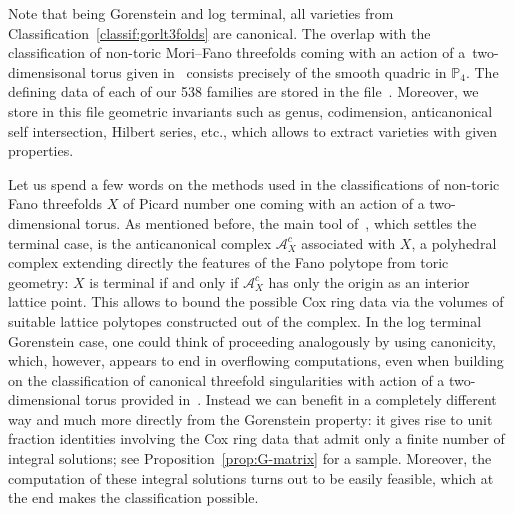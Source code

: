 \documentclass[10pt,a4paper]{amsart}
\theoremstyle{definition}
\def\PP{{\mathbb P}}
\numberwithin{equation}{section}
\begin{document}
Note that being Gorenstein and log terminal,
all varieties from
Classification~\ref{classif:gorlt3folds}
are canonical.
The overlap with the classification of
non-toric Mori--Fano threefolds coming with
an action of a~two-dimensisonal torus given
in~\cite{BeHaHuNi} consists
precisely of the smooth quadric in $\PP_4$.
The defining data of each of our 538
families are stored in the file~\cite{BaHa}.
Moreover, we store in this file geometric
invariants such as genus, codimension,
anticanonical self intersection, Hilbert series,
etc., which allows to extract varieties with
given properties.

Let us spend a few words on the methods used
in the classifications of non-toric Fano threefolds
$X$ of Picard number one coming with an action of
a two-dimensional torus.
As mentioned before, the main tool of~\cite{BeHaHuNi},
which settles the terminal case, is the
anticanonical complex $\mathcal{A}_X^c$
associated with $X$, a polyhedral complex
extending directly the features of the Fano
polytope from toric geometry: $X$ is
terminal if and only if $\mathcal{A}_X^c$
has only the origin as an interior lattice
point. This allows to bound the possible
Cox ring data via the volumes of
suitable lattice polytopes constructed
out of the complex.
In the log terminal Gorenstein case, one
could think of proceeding analogously by
using canonicity, which, however, appears
to end in overflowing computations, even
when building on the classification of
canonical threefold singularities with
action of a two-dimensional torus provided
in~\cite{BrHae}.
Instead we can benefit in a completely
different way and much more directly from
the Gorenstein property: it gives rise to
unit fraction identities involving
the Cox ring data that admit only
a finite number of integral solutions; see
Proposition~\ref{prop:G-matrix} for a sample.
Moreover, the computation of these integral
solutions turns out to be easily feasible,
which at the end makes the classification
possible.
\end{document}
